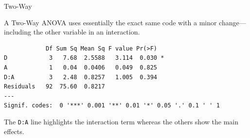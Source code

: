 \begin{frame}[fragile]{Two-Way}

A Two-Way ANOVA uses essentially the exact same code with a minor
change---including the other variable in an interaction.

\begin{Shaded}
\begin{Highlighting}[]
\StringTok{ }\OperatorTok{~}\StringTok{ }\OperatorTok{*}\StringTok{ }
\end{Highlighting}
\end{Shaded}

\begin{verbatim}
            Df Sum Sq Mean Sq F value Pr(>F)  
D            3   7.68  2.5588   3.114  0.030 *
A            1   0.04  0.0406   0.049  0.825  
D:A          3   2.48  0.8257   1.005  0.394  
Residuals   92  75.60  0.8217                 
---
Signif. codes:  0 '***' 0.001 '**' 0.01 '*' 0.05 '.' 0.1 ' ' 1
\end{verbatim}

The \texttt{D:A} line highlights the interaction term whereas the others
show the main effects.

\end{frame}

